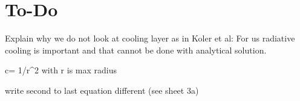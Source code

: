 \section{To-Do}
Explain why we do not look at cooling layer as in Koler et al: For us radiative cooling is important and that cannot be done with analytical solution.

c= 1/r^2 with r is max radius

write second to last equation different (see sheet 3a)